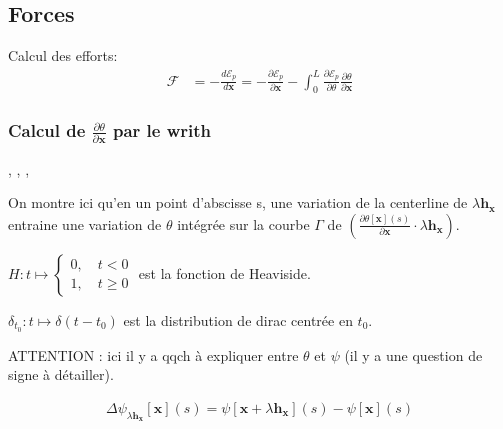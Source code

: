 \subsection{Forces}

Calcul des efforts:
\begin{align}
\boldsymbol{\mathcal{F}} & = -\frac{d\mathcal{E}_p}{d\boldsymbol{x}} =  - \frac{\partial \mathcal{E}_p}{\partial \boldsymbol{x}} - \int_{0}^{L} \tfrac{\partial \mathcal{E}_p}{\partial \theta} \tfrac{\partial \theta}{\partial \boldsymbol{x}}
\end{align}


\subsubsection{Calcul de $\frac{\partial \theta}{\partial \boldsymbol{x}}$ par le writh}

\cite{Fuller1978}, \cite{deVries2005},  \cite{Vauquelin2000}, \cite{Berger2009}

On montre ici qu'en un point d'abscisse s, une variation de la centerline de $\lambda \boldsymbol{h_x}$ entraine une variation de $\theta$ intégrée sur la courbe $\Gamma$ de $(\frac{\partial \theta[\boldsymbol{x}](s)}{\partial\boldsymbol{x}} \cdot \lambda \boldsymbol{h_x})$.

$H : t \mapsto \left\{\begin{array}{c}0  , \quad t<0 \\1  , \quad t\geqslant0\end{array}\right.$ est la fonction de Heaviside.

$\delta_{t_0} : t \mapsto \delta(t-t_0)$ est la distribution de dirac centrée en $t_0$.

ATTENTION : ici il y a qqch à expliquer entre $\theta$ et $\psi$ (il y a une question de signe à détailler).

\begin{align}
	\Delta\psi_{\lambda\boldsymbol{h_x}}[\boldsymbol{x}](s) = \psi[\boldsymbol{x} + \lambda\boldsymbol{h_x}](s) - \psi[\boldsymbol{x}](s)
\end{align}

